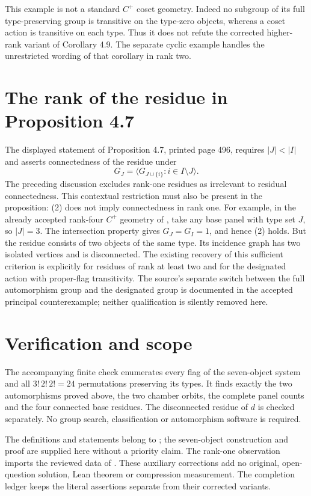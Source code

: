 \documentclass[11pt]{article}
\begin{document}
This example is not a standard $C^+$ coset geometry. Indeed no subgroup
of its full type-preserving group is transitive on the type-zero
objects, whereas a coset action is transitive on each type. Thus it
does not refute the corrected higher-rank variant of Corollary 4.9.
The separate cyclic example handles the unrestricted wording of that
corollary in rank two.

\section{The rank of the residue in Proposition 4.7}
The displayed statement of Proposition 4.7, printed page 496, requires
$|J|<|I|$ and asserts connectedness of the residue under
\[
 G_J=\langle G_{J\cup\{i\}}:i\in I\setminus J\rangle.
                                                               \tag{2}
\]
The preceding discussion excludes rank-one residues as irrelevant to
residual connectedness. This contextual restriction must also be
present in the proposition: (2) does not imply connectedness in rank
one. For example, in the already accepted rank-four $C^+$ geometry
of \cite{HC}, take any base panel with type set $J$, so $|J|=3$.
The intersection property gives $G_J=G_I=1$, and hence (2) holds.
But the residue consists of two objects of the same type. Its
incidence graph has two isolated vertices and is disconnected.
The existing recovery of this sufficient criterion is explicitly for
residues of rank at least two and for the designated action with
proper-flag transitivity. The source's separate switch between the
full automorphism group and the designated group is documented in
the accepted principal counterexample; neither qualification is
silently removed here.

\section{Verification and scope}
The accompanying finite check enumerates every flag of the seven-object
system and all $3!\,2!\,2!=24$ permutations preserving its types.
It finds exactly the two automorphisms proved above, the two chamber
orbits, the complete panel counts and the four connected base residues.
The disconnected residue of $d$ is checked separately. No group search,
classification or automorphism software is required.

The definitions and statements belong to \cite{LT}; the seven-object
construction and proof are supplied here without a priority claim.
The rank-one observation imports the reviewed data of \cite{HC}.
These auxiliary corrections add no original, open-question solution,
Lean theorem or compression measurement. The completion ledger keeps
the literal assertions separate from their corrected variants.
\end{document}
